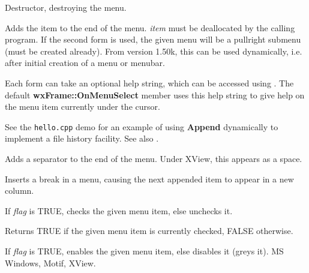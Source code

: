 Destructor, destroying the menu.

\label{wxmenuappend}



Adds the item to the end of the menu. {\it item} must be deallocated by the calling
program.  If the second form is used, the given menu will be a pullright submenu (must be
created already). From version 1.50k, this can be used dynamically, i.e. after initial
creation of a menu or menubar.

Each form can take an optional help string, which can be accessed using
. The default {\bf wxFrame::OnMenuSelect} member
uses this help string to give help on the menu item currently under the
cursor.

See the {\tt hello.cpp} demo for an example of using {\bf Append} dynamically
to implement a file history facility. See also .



Adds a separator to the end of the menu. Under XView, this appears as
a space.



Inserts a break in a menu, causing the next appended item to appear in a new column.



If {\it flag} is TRUE, checks the given menu item, else unchecks it.



Returns TRUE if the given menu item is currently checked, FALSE otherwise.



If {\it flag} is TRUE, enables the given menu item, else disables it
(greys it). MS Windows, Motif, XView.

